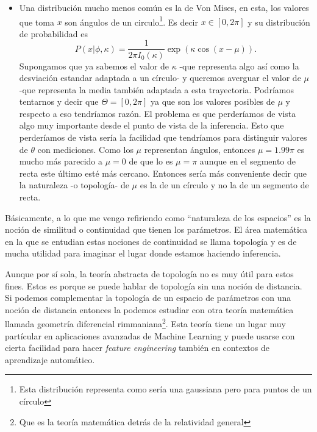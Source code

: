 \begin{itemize}
\begin{itemize}
\begin{equation}
            \Theta = \mathbb{R}^+
        \end{equation}
        \item Y si quisieramos determinar ambas simultaneamente,
        \begin{equation}
            \Theta = \mathbb{R}\times \mathbb{R}^+
        \end{equation}
    \end{itemize}
    \item Una distribución mucho menos común es la de Von Mises, en esta, los valores que toma $x$ son ángulos de un circulo\footnote{Esta distribución representa como sería una gaussiana pero para puntos de un círculo}. Es decir $x\in [0,2\pi]$ y su distribución de probabilidad es
    \begin{equation}
        P(x|\phi,\kappa) = \frac{1}{2\pi I_0(\kappa)}\exp( \kappa \cos (x-\mu)).
    \end{equation}
    Supongamos que ya sabemos el valor de $\kappa$ -que representa algo así como la desviación estandar adaptada a un círculo- y queremos averguar el valor de $\mu$ -que representa la media también adaptada a esta trayectoria. Podríamos tentarnos y decir que $\Theta = [0,2\pi]$ ya que son los valores posibles de $\mu$ y respecto a eso tendríamos razón. El problema es que perderíamos de vista algo muy importante desde el punto de vista de la inferencia. Esto que perderíamos de vista sería la facilidad que tendríamos para distinguir valores de $\theta$ con mediciones. Como los $\mu$ representan ángulos, entonces $\mu=1.99\pi$ es mucho más parecido a $\mu = 0$ de que lo es $\mu = \pi$ aunque en el segmento de recta este último esté más cercano. Entonces sería más conveniente decir que la naturaleza -o topología- de $\mu$ es la de un círculo y no la de un segmento de recta.
\end{itemize}

Básicamente, a lo que me vengo refiriendo como ``naturaleza de los espacios'' es la noción de similitud o continuidad que tienen los parámetros. El área matemática en la que se entudian estas nociones de continuidad se llama topología y es de mucha utilidad para imaginar el lugar donde estamos haciendo inferencia.

Aunque por sí sola, la teoría abstracta de topología no es muy útil para estos fines. Estos es porque se puede hablar de topología sin una noción de distancia. Si podemos complementar la topología de un espacio de parámetros con una noción de distancia entonces la podemos estudiar con otra teoría matemática llamada geometría diferencial rimmaniana\footnote{Que es la teoría matemática detrás de la relatividad general}. Esta teoría tiene un lugar muy partícular en aplicaciones avanzadas de Machine Learning y puede usarse con cierta facilidad para hacer {\it feature engineering} también en contextos de aprendizaje automático.

